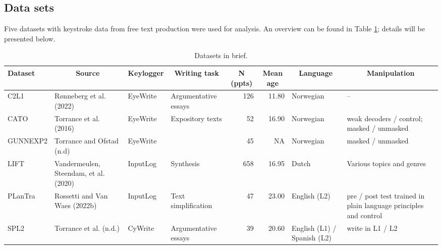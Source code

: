 \documentclass[
  english,
  man,floatsintext]{apa7}
\begin{document}
\hypertarget{data-sets}{%
\subsection{Data sets}\label{data-sets}}

Five datasets with keystroke data from free text production were used for analysis. An overview can be found in Table \ref{tab:datasets}; details will be presented below.

\begin{landscape}

\begin{table}[tbp]

\begin{center}
\begin{threeparttable}

\caption{\label{tab:datasets}Datasets in brief.}

\footnotesize{

\begin{tabular}{llllrrp{2cm}p{3cm}}
\toprule
Dataset & \multicolumn{1}{c}{Source} & \multicolumn{1}{c}{Keylogger} & \multicolumn{1}{c}{Writing task} & \multicolumn{1}{c}{N (ppts)} & \multicolumn{1}{c}{Mean age} & \multicolumn{1}{c}{Language} & \multicolumn{1}{c}{Manipulation}\\
\midrule
C2L1 & Rønneberg et al. (2022) & EyeWrite & Argumentative essays & 126 & 11.80 & Norwegian & --\\
CATO & Torrance et al. (2016) & EyeWrite & Expository texts & 52 & 16.90 & Norwegian & weak decoders / control; masked / unmasked\\
GUNNEXP2 & Torrance and Ofstad (n.d) & EyeWrite &  & 45 & NA & Norwegian & masked / unmasked\\
LIFT & Vandermeulen, Steendam, et al. (2020) & InputLog & Synthesis & 658 & 16.95 & Dutch & Various topics and genres\\
PLanTra & Rossetti and Van Waes (2022b) & InputLog & Text simplification & 47 & 23.00 & English (L2) & pre / post test trained in plain language principles and control\\
SPL2 & Torrance et al. (n.d.) & CyWrite & Argumentative essays & 39 & 20.60 & English (L1) / Spanish (L2) & write in L1 / L2\\
\bottomrule
\end{tabular}

}

\end{threeparttable}
\end{center}

\end{table}
\end{landscape}
\end{document}

